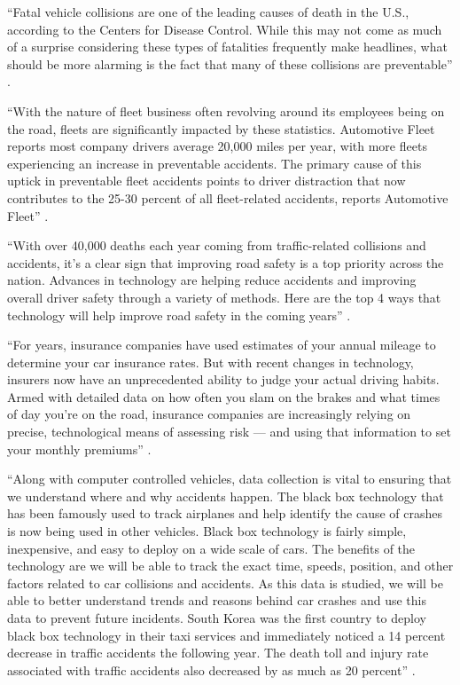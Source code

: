 ``Fatal vehicle collisions are one of the leading causes of death in the U.S., according to the Centers for Disease Control. While this may not come as much of a surprise considering these types of fatalities frequently make headlines, what should be more alarming is the fact that many of these collisions are preventable'' \cite{Suizo2015decisions}.

``With the nature of fleet business often revolving around its employees being on the road, fleets are significantly impacted by these statistics. Automotive Fleet reports most company drivers average 20,000 miles per year, with more fleets experiencing an increase in preventable accidents. The primary cause of this uptick in preventable fleet accidents points to driver distraction that now contributes to the 25-30 percent of all fleet-related accidents, reports Automotive Fleet'' \cite{Suizo2015decisions}.

``With over 40,000 deaths each year coming from traffic-related collisions and accidents, it's a clear sign that improving road safety is a top priority across the nation. Advances in technology are helping reduce accidents and improving overall driver safety through a variety of methods. Here are the top 4 ways that technology will help improve road safety in the coming years'' \cite{Mills2017safety}.

``For years, insurance companies have used estimates of your annual mileage to determine your car insurance rates. But with recent changes in technology, insurers now have an unprecedented ability to judge your actual driving habits. Armed with detailed data on how often you slam on the brakes and what times of day you're on the road, insurance companies are increasingly relying on precise, technological means of assessing risk — and using that information to set your monthly premiums'' \cite{Fung2016turn}.

``Along with computer controlled vehicles, data collection is vital to ensuring that we understand where and why accidents happen. The black box technology that has been famously used to track airplanes and help identify the cause of crashes is now being used in other vehicles. Black box technology is fairly simple, inexpensive, and easy to deploy on a wide scale of cars. The benefits of the technology are we will be able to track the exact time, speeds, position, and other factors related to car collisions and accidents. As this data is studied, we will be able to better understand trends and reasons behind car crashes and use this data to prevent future incidents. South Korea was the first country to deploy black box technology in their taxi services and immediately noticed a 14 percent decrease in traffic accidents the following year. The death toll and injury rate associated with traffic accidents also decreased by as much as 20 percent'' \cite{Mills2017safety}.

